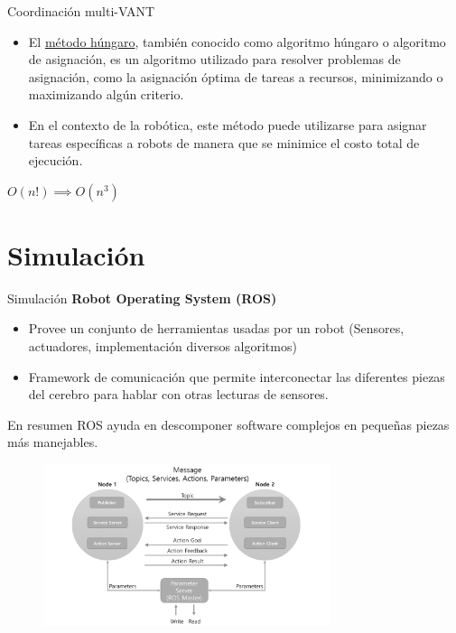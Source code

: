 \documentclass[
  24pt, %
  aspectratio=169, %
]{beamer}
\begin{document}
\begin{frame}{Coordinación multi-VANT}

  \begin{itemize}
  \item El \underline{método húngaro}, también conocido como algoritmo húngaro o algoritmo de asignación, es un algoritmo utilizado para resolver problemas de asignación, como la asignación óptima de tareas a recursos, minimizando o maximizando algún criterio.

  \item En el contexto de la robótica, este método puede utilizarse para asignar tareas específicas a robots de manera que se minimice el costo total de ejecución.
  \end{itemize}

  \centering
  $O(n!) \implies O(n^{3})$
  
\end{frame}

\section{Simulación}
\begin{frame}{Simulación}
  \textbf{Robot Operating System (ROS)}\\
  \bigskip %
  \begin{itemize}
  \item Provee un conjunto de herramientas usadas por un robot (Sensores, actuadores, implementación diversos algoritmos)
  \item Framework de comunicación que permite interconectar las diferentes piezas del cerebro para hablar con otras lecturas de sensores.
  \end{itemize}
  \bigskip %
  En resumen ROS ayuda en descomponer software complejos en pequeñas piezas más manejables.
  
\end{frame}

\begin{frame}
  \begin{figure}
    \centering
    \includegraphics[width=0.75\textwidth]{ros_1}
  \end{figure}
\end{frame}
\end{document}
